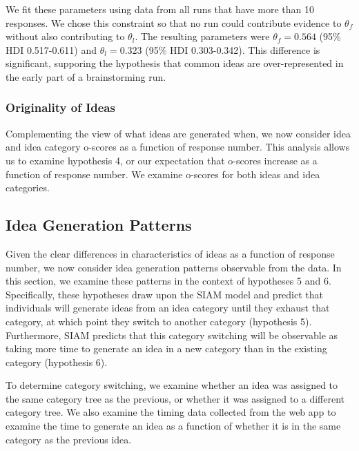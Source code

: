 We fit these parameters using data from all runs that have more than 10 responses. We chose this constraint so that no run could contribute evidence to $\theta_f$ without also contributing to $\theta_l$. The resulting parameters were $\theta_f = 0.564$ (95\% HDI 0.517-0.611) and $\theta_l = 0.323$ (95\% HDI 0.303-0.342). This difference is significant, supporing the hypothesis that common ideas are over-represented in the early part of a brainstorming run.



\subsubsection{Originality of Ideas}
Complementing the view of what ideas are generated when, we now consider idea and idea category o-scores as a function of response number. This analysis allows us to examine hypothesis 4, or our expectation that o-scores increase as a function of response number. We examine o-scores for both ideas and idea categories.



\subsection{Idea Generation Patterns}
Given the clear differences in characteristics of ideas as a function of response number, we now consider idea generation patterns observable from the data. In this section, we examine these patterns in the context of hypotheses 5 and 6. Specifically, these hypotheses draw upon the SIAM model and predict that individuals will generate ideas from an idea category until they exhaust that category, at which point they switch to another category (hypothesis 5). Furthermore, SIAM predicts that this category switching will be observable as taking more time to generate an idea in a new category than in the existing category (hypothesis 6).

To determine category switching, we examine whether an idea was assigned to the same category tree as the previous, or whether it was assigned to a different category tree. We also examine the timing data collected from the web app to examine the time to generate an idea as a function of whether it is in the same category as the previous idea.

